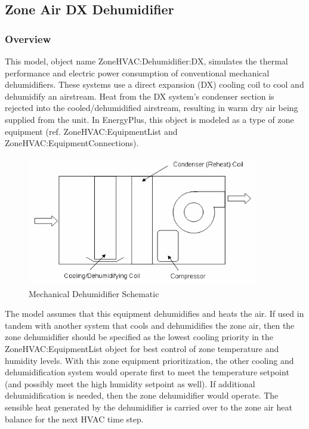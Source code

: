 \subsection{Zone Air DX Dehumidifier}\label{zone-air-dx-dehumidifier}

\subsubsection{Overview}\label{overview-9-000}

This model, object name ZoneHVAC:Dehumidifier:DX, simulates the thermal performance and electric power consumption of conventional mechanical dehumidifiers. These systems use a direct expansion (DX) cooling coil to cool and dehumidify an airstream. Heat from the DX system's condenser section is rejected into the cooled/dehumidified airstream, resulting in warm dry air being supplied from the unit. In EnergyPlus, this object is modeled as a type of zone equipment (ref. ZoneHVAC:EquipmentList and ZoneHVAC:EquipmentConnections).

\begin{figure}[hbtp] %
\centering
\includegraphics[width=0.9\textwidth, height=0.9\textheight, keepaspectratio=true]{media/image7287.png}
\caption{Mechanical Dehumidifier Schematic \protect \label{fig:mechanical-dehumidifier-schematic}}
\end{figure}

The model assumes that this equipment dehumidifies and heats the air. If used in tandem with another system that cools and dehumidifies the zone air, then the zone dehumidifier should be specified as the lowest cooling priority in the ZoneHVAC:EquipmentList object for best control of zone temperature and humidity levels. With this zone equipment prioritization, the other cooling and dehumidification system would operate first to meet the temperature setpoint (and possibly meet the high humidity setpoint as well). If additional dehumidification is needed, then the zone dehumidifier would operate. The sensible heat generated by the dehumidifier is carried over to the zone air heat balance for the next HVAC time step.

